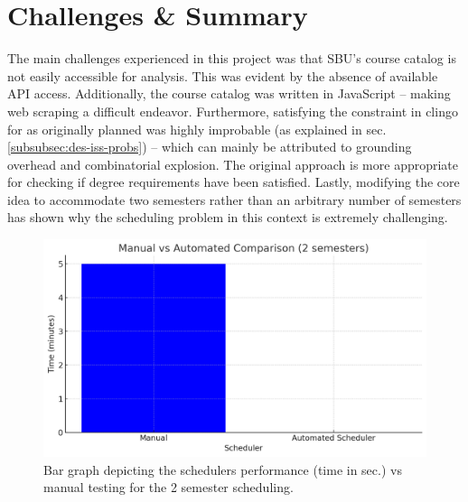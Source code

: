 \documentclass[12pt]{article}
\begin{document}
    \section{Challenges \& Summary}
    \label{sec:chall-summ}

    The main challenges experienced in this project was that SBU's course catalog is not easily accessible for analysis. This was evident by the absence of available API access. Additionally, the course catalog was written in JavaScript -- making web scraping a difficult endeavor. Furthermore, satisfying the constraint in clingo for as originally planned was highly improbable (as explained in sec. \ref{subsubsec:des-iss-probs}) -- which can mainly be attributed to grounding overhead and combinatorial explosion. The original approach is more appropriate for checking if degree requirements have been satisfied. Lastly, modifying the core idea to accommodate two semesters rather than an arbitrary number of semesters has shown why the scheduling problem in this context is extremely challenging.


    \begin{figure}[h!]
        \centering
        \includegraphics[scale=0.5]{figures/eval/bar-graph-2sem.png}
        \caption{Bar graph depicting the schedulers performance (time in sec.) vs manual testing for the 2 semester scheduling.}
        \label{fig:2sem}
    \end{figure}
\end{document}
